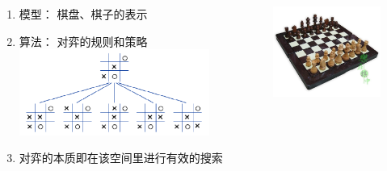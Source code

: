 \begin{frame}[fragile]
  \frametitle{~}
  \begin{columns}
    \begin{column}[T]{.65\linewidth}
      \begin{enumerate}
      \item 模型： 棋盘、棋子的表示
      \item 算法： 对弈的规则和策略
        \includegraphics[width=0.8\textwidth]{figs/intro/chess_2.png}
      \item 对弈的本质即在该空间里进行有效的搜索
      \end{enumerate}
    \end{column}
    \begin{column}[T]{.3\linewidth}
      \includegraphics[width=0.8\textwidth]{figs/intro/chess_1.png}
    \end{column}
  \end{columns}
\end{frame}


